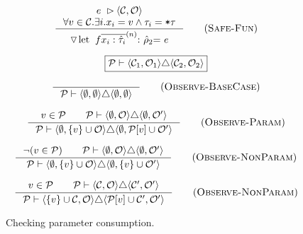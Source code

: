 \begin{figure}

\begin{equation*}
  \inference{
    \inPlaceSafe{e}{\mathcal{C}}{\mathcal{O}}
    \\
    \forall v\in\mathcal{C}.\exists i.x_{i} = v \wedge \tau_{i} = \texttt{*}\tau
  }{
    \triangledown\Fun{$f$}{$\nseq{x_{i}: \hat{\tau}_{i}}{n}$}{$\utty_2$}{$e$}
  } \tagsc{Safe-Fun}
\end{equation*}


\begin{equation*}
\boxed{
  \mathcal{P} \vdash \langle\mathcal{C}_{1},\mathcal{O}_{1}\rangle \triangle \langle\mathcal{C}_{2},\mathcal{O}_{2}\rangle
}
\end{equation*}

\begin{equation*}
\inference{
}{
\mathcal{P} \vdash \langle \emptyset, \emptyset \rangle \triangle \langle \emptyset, \emptyset \rangle
} \tagsc{Observe-BaseCase}
\end{equation*}

\begin{equation*}
\inference{
v \in \mathcal{P} \qquad \mathcal{P} \vdash \langle \emptyset, \mathcal{O} \rangle \triangle \langle \emptyset, \mathcal{O}' \rangle
}
{
\mathcal{P} \vdash \langle \emptyset, \{ v \} \cup \mathcal{O} \rangle \triangle \langle \emptyset, \mathcal{P}[v] \cup \mathcal{O}' \rangle
}\tagsc{Observe-Param}
\end{equation*}

\begin{equation*}
\inference{
\neg(v \in \mathcal{P}) \qquad \mathcal{P} \vdash \langle \emptyset, \mathcal{O} \rangle \triangle \langle \emptyset, \mathcal{O}' \rangle
}
{
\mathcal{P} \vdash \langle \emptyset, \{ v \} \cup \mathcal{O} \rangle \triangle \langle \emptyset, \{ v \} \cup \mathcal{O}' \rangle
}\tagsc{Observe-NonParam}
\end{equation*}

\begin{equation*}
\inference{
v \in \mathcal{P} \qquad \mathcal{P} \vdash \langle \mathcal{C}, \mathcal{O} \rangle \triangle \langle \mathcal{C}', \mathcal{O}' \rangle
}
{
\mathcal{P} \vdash \langle \{ v \} \cup \mathcal{C}, \mathcal{O} \rangle \triangle \langle \mathcal{P}[v] \cup \mathcal{C}', \mathcal{O}' \rangle
}\tagsc{Observe-NonParam}
\end{equation*}
  \caption{Checking parameter consumption.}
  \label{fig:parameter-consumption}
\end{figure}


